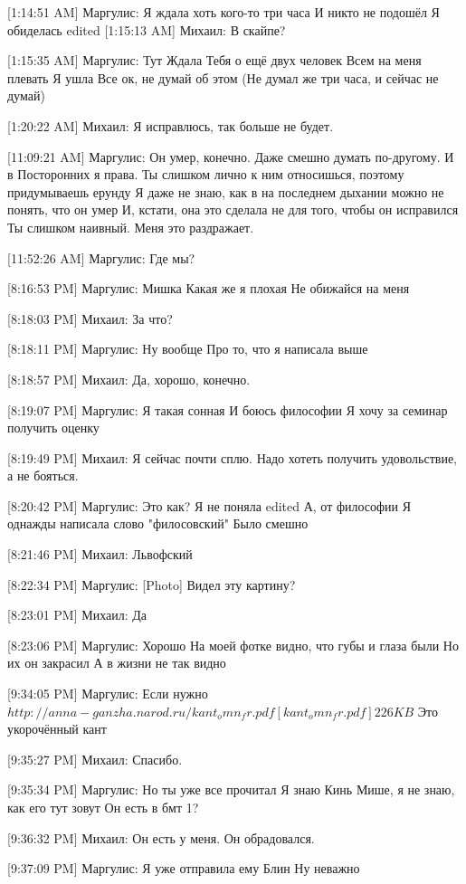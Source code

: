 \documentclass{article}
\begin{document}
[1:14:51 AM] Маргулис:
Я ждала хоть кого-то три часа
 И никто не подошёл
 Я обиделась
edited 
[1:15:13 AM] Михаил:
В скайпе?

[1:15:35 AM] Маргулис:
Тут
 Ждала
 Тебя о ещё двух человек
 Всем на меня плевать
 Я ушла
 Все ок, не думай об этом
 (Не думал же три часа, и сейчас не думай)

[1:20:22 AM] Михаил:
Я исправлюсь, так больше не будет.

[11:09:21 AM] Маргулис:
Он умер, конечно. Даже смешно думать по-другому. И в Посторонних я права. Ты слишком лично к ним относишься, поэтому придумываешь ерунду
 Я даже не знаю, как в на последнем дыхании можно не понять, что он умер
 И, кстати, она это сделала не для того, чтобы он исправился
 Ты слишком наивный.
 Меня это раздражает.

[11:52:26 AM] Маргулис:
Где мы?

[8:16:53 PM] Маргулис:
Мишка
 Какая же я плохая
 Не обижайся на меня

[8:18:03 PM] Михаил:
За что?

[8:18:11 PM] Маргулис:
Ну вообще
 Про то, что я написала выше

[8:18:57 PM] Михаил:
Да, хорошо, конечно.

[8:19:07 PM] Маргулис:
Я такая сонная
 И боюсь философии
 Я хочу за семинар получить оценку

[8:19:49 PM] Михаил:
Я сейчас почти сплю.
 Надо хотеть получить удовольствие, а не бояться.

[8:20:42 PM] Маргулис:
Это как?
 Я не поняла
edited 
А, от философии
 Я однажды написала слово "филосовский"
 Было смешно

[8:21:46 PM] Михаил:
Львофский

[8:22:34 PM] Маргулис:
[Photo]
 Видел эту картину?

[8:23:01 PM] Михаил:
Да

[8:23:06 PM] Маргулис:
Хорошо
 На моей фотке видно, что губы и глаза были
 Но их он закрасил
 А в жизни не так видно

[9:34:05 PM] Маргулис:
Если нужно
$ http://anna-ganzha.narod.ru/kant_omn_fr.pdf
[kant_omn_fr.pdf] 226 KB$
 Это укорочённый кант

[9:35:27 PM] Михаил:
Спасибо.

[9:35:34 PM] Маргулис:
Но ты уже все прочитал
 Я знаю
 Кинь Мише, я не знаю, как его тут зовут
 Он есть в бмт 1?

[9:36:32 PM] Михаил:
Он есть у меня.
 Он обрадовался.

[9:37:09 PM] Маргулис:
Я уже отправила ему
 Блин
 Ну неважно
\end{document}
